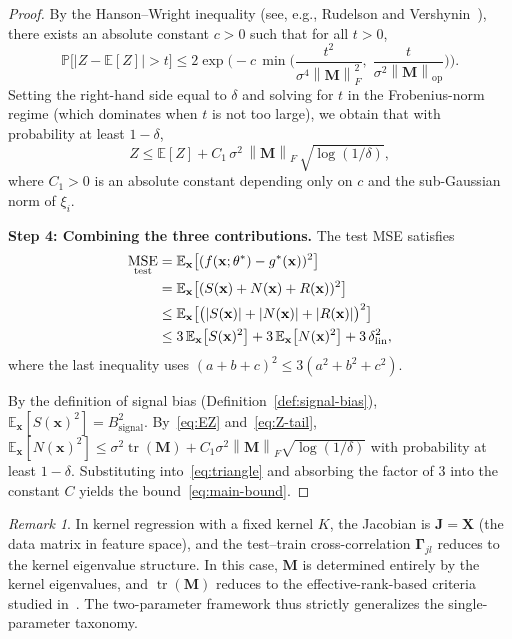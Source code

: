 \documentclass[12pt]{amsart}
\theoremstyle{definition}
\theoremstyle{remark}
\newtheorem{remark}[theorem]{Remark}
\DeclareMathOperator{\tr}{tr}
\DeclareMathOperator{\MSE}{MSE}
\newcommand{\E}{\mathbb{E}}
\newcommand{\Prob}{\mathbb{P}}
\newcommand{\bx}{\mathbf{x}}
\newcommand{\bX}{\mathbf{X}}
\newcommand{\bJ}{\mathbf{J}}
\newcommand{\bM}{\mathbf{M}}
\newcommand{\norm}[1]{\left\lVert #1 \right\rVert}
\newcommand{\abs}[1]{\left\lvert #1 \right\rvert}
\begin{document}
\begin{proof}
By the Hanson--Wright inequality (see, e.g., Rudelson and
Vershynin~\cite{RV2013}), there exists an absolute constant $c > 0$ such that
for all $t > 0$,
\begin{equation}\label{eq:HW}
  \Prob\bigl[\abs{Z - \E[Z]} > t\bigr]
  \leq 2\exp\biggl(
    -c\,\min\biggl(
      \frac{t^{2}}{\sigma^{4}\norm{\bM}_{F}^{2}},\;
      \frac{t}{\sigma^{2}\norm{\bM}_{\mathrm{op}}}
    \biggr)
  \biggr).
\end{equation}
Setting the right-hand side equal to $\delta$ and solving for $t$ in the
Frobenius-norm regime (which dominates when $t$ is not too large), we obtain that
with probability at least $1 - \delta$,
\begin{equation}\label{eq:Z-tail}
  Z \leq \E[Z]
    + C_{1}\,\sigma^{2}\,\norm{\bM}_{F}\,\sqrt{\log(1/\delta)},
\end{equation}
where $C_{1} > 0$ is an absolute constant depending only on $c$ and the
sub-Gaussian norm of $\xi_{i}$.

\medskip
\noindent\textbf{Step 4: Combining the three contributions.}
The test MSE satisfies
\begin{align}
  \MSE_{\mathrm{test}}
  &= \E_{\bx}\bigl[(f(\bx;\theta^{*}) - g^{*}(\bx))^{2}\bigr] \notag \\
  &= \E_{\bx}\bigl[(S(\bx) + N(\bx) + R(\bx))^{2}\bigr] \notag \\
  &\leq \E_{\bx}\bigl[\bigl(\abs{S(\bx)} + \abs{N(\bx)}
         + \abs{R(\bx)}\bigr)^{2}\bigr] \notag \\
  &\leq 3\,\E_{\bx}\bigl[S(\bx)^{2}\bigr]
         + 3\,\E_{\bx}\bigl[N(\bx)^{2}\bigr]
         + 3\,\delta_{\mathrm{lin}}^{2}, \label{eq:triangle}
\end{align}
where the last inequality uses $(a+b+c)^{2} \leq 3(a^{2}+b^{2}+c^{2})$.

By the definition of signal bias (Definition~\ref{def:signal-bias}),
$\E_{\bx}[S(\bx)^{2}] = B_{\mathrm{signal}}^{2}$.  By~\eqref{eq:EZ}
and~\eqref{eq:Z-tail},
$\E_{\bx}[N(\bx)^{2}] \leq \sigma^{2}\tr(\bM) + C_{1}\sigma^{2}\norm{\bM}_{F}\sqrt{\log(1/\delta)}$
with probability at least $1 - \delta$.  Substituting into~\eqref{eq:triangle}
and absorbing the factor of $3$ into the constant $C$ yields the
bound~\eqref{eq:main-bound}.
\end{proof}

\begin{remark}\label{rem:kernel-special}
In kernel regression with a fixed kernel $K$, the Jacobian is
$\bJ = \bX$ (the data matrix in feature space), and the test--train
cross-correlation $\boldsymbol{\Gamma}_{jl}$ reduces to the kernel eigenvalue
structure.  In this case, $\bM$ is determined entirely by the kernel eigenvalues,
and $\tr(\bM)$ reduces to the effective-rank-based criteria studied
in~\cite{BLLT2020, TB2023, MSCBR2022}.  The two-parameter framework thus
strictly generalizes the single-parameter taxonomy.
\end{remark}
\end{document}
